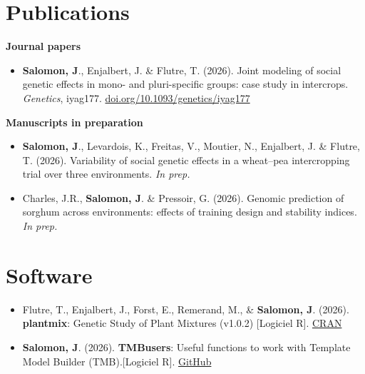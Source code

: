 \documentclass[10pt,a4paper]{article}
\begin{document}
\section{Publications}
\textbf{Journal papers}
\begin{itemize}[label=\textemdash]
  \item \textbf{Salomon, J}., Enjalbert, J. \& Flutre, T. (2026). Joint modeling of social genetic effects in mono- and pluri-specific groups: case study in intercrops. \textit{Genetics}, iyag177. \href{https://doi.org/10.1093/genetics/iyag177}{doi.org/10.1093/genetics/iyag177}
\end{itemize}
\bigskip
\textbf{Manuscripts in preparation}
\begin{itemize}[label=\textemdash, itemsep=6pt]
  \item \textbf{Salomon, J}., Levardois, K., Freitas, V., Moutier, N., Enjalbert, J. \& Flutre, T. (2026). Variability of social genetic effects in a wheat--pea intercropping trial over three environments. \textit{In prep.}
  \item Charles, J.R., \textbf{Salomon, J}. \& Pressoir, G. (2026). Genomic prediction of sorghum across environments: effects of training design and stability indices. \textit{In prep.}
\end{itemize}
\newpage
\section{Software}
\begin{itemize}[label=\textemdash, itemsep=6pt]
  \item Flutre, T., Enjalbert, J., Forst, E., Remerand, M., \& \textbf{Salomon, J}. (2026). \textbf{plantmix}: Genetic Study of Plant Mixtures (v1.0.2) [Logiciel R]. \href{https://cran.r-project.org/web/packages/plantmix/index.html}{CRAN}
    \item \textbf{Salomon, J}. (2026). \textbf{TMBusers}: Useful functions to work with Template Model Builder (TMB).[Logiciel R]. \href{https://github.com/JemaySALOMON/TMBusers}{GitHub}
\end{itemize}

\end{document}
